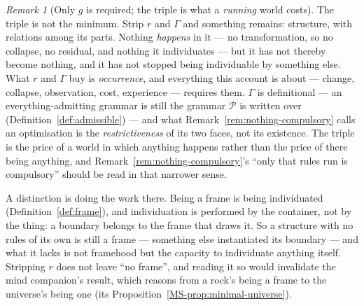 \documentclass[11pt,a4paper]{article}
\theoremstyle{remark}\newtheorem{remark}[definition]{Remark}
\newcommand{\Poss}{\mathcal{P}}
\begin{document}
\begin{remark}[Only $g$ is required; the triple is what a \emph{running} world costs]\label{rem:only-g}
The triple is not the minimum. Strip $r$ and
$\Gamma$ and something remains: structure, with relations among its parts. Nothing \emph{happens} in
it --- no transformation, so no collapse, no residual, and nothing it individuates --- but it has not
thereby become nothing, and it has not stopped being individuable by something else. What $r$ and
$\Gamma$ buy is \emph{occurrence}, and everything this account is about --- change, collapse,
observation, cost, experience --- requires them. $\Gamma$ is definitional --- an everything-admitting
grammar is still the grammar $\Poss$ is written over (Definition~\ref{def:admissible}) --- and what
Remark~\ref{rem:nothing-compulsory} calls an optimisation is the \emph{restrictiveness} of its two
faces, not its existence. The triple is the price of a world in which anything
happens rather than the price of there being anything, and Remark~\ref{rem:nothing-compulsory}'s
``only that rules run is compulsory'' should be read in that narrower sense.

A distinction is doing the work there. Being a
frame is being individuated (Definition~\ref{def:frame}), and individuation is performed by the
container, not by the thing: a boundary belongs to the frame that draws it. So a structure with no
rules of its own is still a frame --- something else instantiated its boundary --- and what it lacks
is not framehood but the capacity to individuate anything itself. Stripping $r$ does not leave ``no frame'', and reading it so would invalidate the mind companion's result, which reasons from a rock's being a frame to the universe's being one (its Proposition~\ref{MS-prop:minimal-universe}).
\end{remark}
\end{document}
